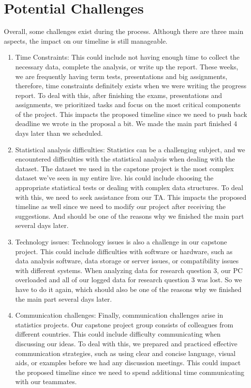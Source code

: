 \documentclass[12pt]{article}
\begin{document}
\section{Potential Challenges}
Overall, some challenges exist during the process. Although there are three main aspects, the impact on our timeline is still manageable.  
\begin{enumerate}
	\item Time Constraints: This could include not having enough time to collect the necessary data, complete the analysis, or write up the report. These weeks, we are frequently having term tests, presentations and big assignments, therefore, time constraints definitely exists when we were writing the progress report. To deal with this, after finishing the exams, presentations and assignments, we prioritized tasks and focus on the most critical components of the project. This impacts the proposed timeline since we need to push back deadline we wrote in the proposal a bit. We made the main part finished 4 days later than we scheduled.
	\item Statistical analysis difficulties: Statistics can be a challenging subject, and we encountered difficulties with the statistical analysis when dealing with the dataset. The dataset we used in the capstone project is the most complex dataset we've seen in my entire live. his could include choosing the appropriate statistical tests or dealing with complex data structures. To deal with this, we need to seek assistance from our TA. This impacts the proposed timeline as well since we need to modify our project after receiving the suggestions. And should be one of the reasons why we finished the main part several days later.
	\item Technology issues: Technology issues is also a challenge in our capstone project. This could include difficulties with software or hardware, such as data analysis software, data storage or server issues, or compatibility issues with different systems. When analyzing data for research question 3, our PC overloaded and all of our logged data for research question 3 was lost. So we have to do it again, which should also be one of the reasons why we finished the main part several days later. 
	\item Communication challenges: Finally, communication challenges arise in statistics projects. Our capstone project group consists of colleagues from different countries. This could include difficulty communicating when discussing our ideas. To deal with this, we prepared and practiced effective communication strategies, such as using clear and concise language, visual aids, or examples before we had any discussion meetings. This could impact the proposed timeline since we need to spend additional time communicating with our teammates. 
\end{enumerate}
\end{document}

